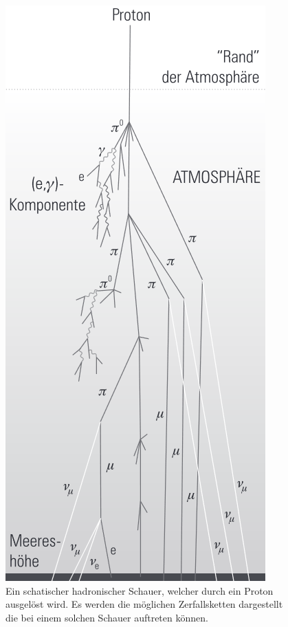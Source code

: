\begin{figure}
\begin{minipage}{0.4\textwidth}
    \includegraphics[width=\textwidth]{data/hadronischerschauer.png}
    \caption{Ein schatischer hadronischer Schauer, welcher durch ein Proton ausgelöst wird.
    Es werden die möglichen Zerfallsketten dargestellt die bei einem solchen Schauer auftreten können. \cite{astroteilchenbuch}}
    \label{fig:hadronischerschauer}
\end{minipage}
\end{figure}\FloatBarrier
